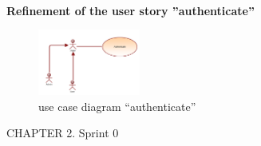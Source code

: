 \documentclass{article}
\begin{document}
\\{\large \textbf{Refinement of the user story ”authenticate”}
\begin{figure}[htbp]
    \centering
    \includegraphics[width=0.3\textwidth]{Authenticate}
    \caption{use case diagram “authenticate”}
    \label{fig:design2}
\end{figure}
\newpage
\noindent
CHAPTER 2.  Sprint 0 \\
\underline{\hspace{\textwidth}} \vspace{0.2cm}\\

}
\end{document}
